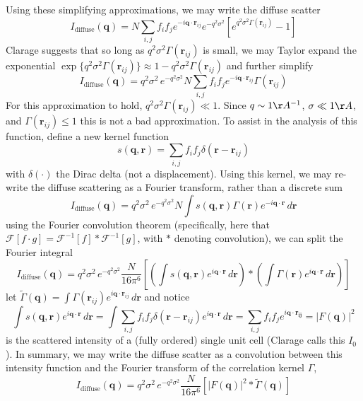 \documentclass{article}
\begin{document}
Using these simplifying approximations, we may write the diffuse scatter
\[
I_\mathrm{diffuse} (\mathbf{q}) = N \sum\limits_{i,j} f_i f_j e^{-i \mathbf{q} \cdot \mathbf{r}_{ij}} 
%
e^{- q^2 \sigma^2}
%
\left[ 
e^{q^2 \sigma^2 \Gamma(\mathbf{r}_{ij})} - 1
\right]
\]
Clarage suggests that so long as $q^2 \sigma^2 \Gamma(\mathbf{r}_{ij})$ is small, we may Taylor expand the exponential $\exp \{ q^2 \sigma^2 \Gamma(\mathbf{r}_{ij}) \} \approx 1 - q^2 \sigma^2 \Gamma(\mathbf{r}_{ij})$ and further simplify
\[
I_\mathrm{diffuse} (\mathbf{q}) = q^2 \sigma^2 \, e^{- q^2 \sigma^2} N 
\sum\limits_{i,j} f_i f_j e^{-i \mathbf{q} \cdot \mathbf{r}_{ij}} \Gamma(\mathbf{r}_{ij})
\]
For this approximation to hold, $q^2 \sigma^2 \Gamma(\mathbf{r}_{ij}) \ll 1$. Since $q \sim 1 \AA^{-1}$, $\sigma \ll 1 \AA$, and $\Gamma(\mathbf{r}_{ij}) \leq 1$ this is not a bad approximation. To assist in the analysis of this function, define a new kernel function
\[
s( \mathbf{q}, \mathbf{r}) = \sum_{i,j} f_i f_j \delta( \mathbf{r} - \mathbf{r}_{ij})
\]
with $\delta(\cdot)$ the Dirac delta (not a displacement). Using this kernel, we may re-write the diffuse scattering as a Fourier transform, rather than a discrete sum
\[
I_\mathrm{diffuse} (\mathbf{q}) = q^2 \sigma^2 \, e^{- q^2 \sigma^2} N 
\int s( \mathbf{q}, \mathbf{r})  \Gamma(\mathbf{r}) e^{-i \mathbf{q} \cdot \mathbf{r}} \, d \mathbf{r}
\]
using the Fourier convolution theorem (specifically, here that $ \mathcal{F}[ f \cdot g ] = \mathcal{F}^{-1}[f] \ast \mathcal{F}^{-1}[g]$, with $\ast$ denoting convolution), we can split the Fourier integral
\[
I_\mathrm{diffuse} (\mathbf{q}) = q^2 \sigma^2 \, e^{- q^2 \sigma^2} \frac{N}{16 \pi^6} 
\left[ \left( \int s( \mathbf{q}, \mathbf{r})  e^{i \mathbf{q} \cdot \mathbf{r}} \, d \mathbf{r} \right) \ast
\left( \int \Gamma(\mathbf{r})   e^{i \mathbf{q} \cdot \mathbf{r}} \, d \mathbf{r} \right) \right]
\]
let $\tilde{\Gamma} (\mathbf{q}) = \int \Gamma(\mathbf{r}_{ij})   e^{i \mathbf{q} \cdot \mathbf{r}_{ij}} \, d \mathbf{r}$ and notice 
\[
\int s( \mathbf{q}, \mathbf{r})  e^{i \mathbf{q} \cdot \mathbf{r}} \, d \mathbf{r} =
%
\int \sum_{i,j} f_i f_j \delta( \mathbf{r} - \mathbf{r}_{ij}) e^{i \mathbf{q} \cdot \mathbf{r}}  \, d \mathbf{r} =
%
\sum_{i,j} f_i f_j e^{i \mathbf{q} \cdot \mathbf{r_{ij}}} = | F(\mathbf{q}) |^2
\]
is the scattered intensity of a (fully ordered) single unit cell (Clarage calls this $I_0$). In summary, we may write the diffuse scatter as a convolution between this intensity function and the Fourier transform of the correlation kernel $\Gamma$,
\begin{equation}
I_\mathrm{diffuse} (\mathbf{q}) = q^2 \sigma^2 \, e^{- q^2 \sigma^2} \frac{N}{16 \pi^6} 
\left[ | F(\mathbf{q}) |^2 \ast \tilde{\Gamma}(\mathbf{q}) \right]
\end{equation}
\end{document}
